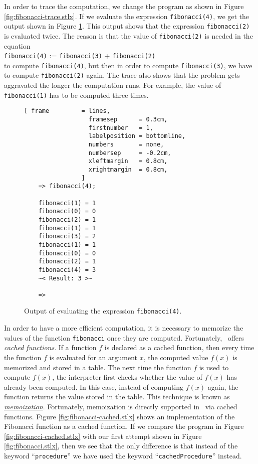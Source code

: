 In order to trace the computation, we change the program as shown in Figure
\ref{fig:fibonacci-trace.stlx}.  
If we evaluate the expression \texttt{fibonacci(4)}, we get the output shown in Figure
\ref{fig:fibonacci.trace}.  This output shows that the expression \texttt{fibonacci(2)} is
evaluated twice.  The reason is that the value of \texttt{fibonacci(2)} is needed in the equation
\\[0.2cm]
\hspace*{1.3cm}
\texttt{fibonacci(4)} := \texttt{fibonacci(3)} + \texttt{fibonacci(2)}
\\[0.2cm]
to compute \texttt{fibonacci(4)}, but then in order to compute \texttt{fibonacci(3)}, we
have to compute \texttt{fibonacci(2)} again.  The trace also shows that the problem gets
aggravated the longer the computation runs.  For example, the value of
\texttt{fibonacci(1)} has to be computed three times.

\begin{figure}[!ht]
\centering
\begin{Verbatim}[ frame         = lines, 
                  framesep      = 0.3cm, 
                  firstnumber   = 1,
                  labelposition = bottomline,
                  numbers       = none,
                  numbersep     = -0.2cm,
                  xleftmargin   = 0.8cm,
                  xrightmargin  = 0.8cm,
                ]
    => fibonacci(4);
    
    fibonacci(1) = 1
    fibonacci(0) = 0
    fibonacci(2) = 1
    fibonacci(1) = 1
    fibonacci(3) = 2
    fibonacci(1) = 1
    fibonacci(0) = 0
    fibonacci(2) = 1
    fibonacci(4) = 3
    ~< Result: 3 >~
    
    => 
\end{Verbatim}
\vspace*{-0.3cm}
\caption{Output of evaluating the expression \texttt{fibonacci(4)}.}
\label{fig:fibonacci.trace}
\end{figure}


In order to have a more efficient computation, it is necessary to memorize the values of
the function \texttt{fibonacci} once they are computed.  Fortunately, \setlx\ offers
\emph{cached functions}.  If a function $f$ is declared as a cached function, then every
time the function $f$ is evaluated for an argument $x$, the computed value $f(x)$ is
memorized and stored in a table.  The next time the function $f$ is used to compute
$f(x)$, the interpreter first checks whether the value of $f(x)$ has already been
computed.  In this case, instead of computing $f(x)$ again,  the function returns the
value stored in the table.  This technique is known as
\href{http://en.wikipedia.org/wiki/Memoization}{\emph{memoization}}.
Fortunately, memoization is directly supported in \setlx\ via cached functions.
Figure
\ref{fig:fibonacci-cached.stlx} shows an implementation of the Fibonacci function as a
cached function.  If we compare the program in Figure
\ref{fig:fibonacci-cached.stlx} with our first attempt shown in Figure
\ref{fig:fibonacci.stlx}, then we see that the only difference is that instead of the
keyword ``\texttt{procedure}'' we have used the keyword ``\texttt{cachedProcedure}'' instead.


